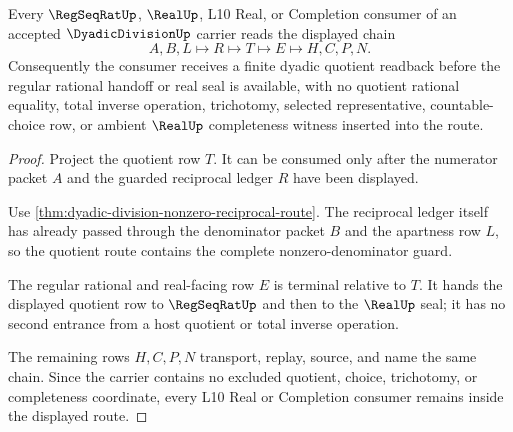 \begin{theorem}
\label{thm:dyadic-division-real-readback-nonescape}
Every $\RegSeqRatUp$, $\RealUp$, L10 Real, or Completion consumer of an accepted $\DyadicDivisionUp$ carrier reads the displayed chain
$$
A,B,L \longmapsto R \longmapsto T \longmapsto E \longmapsto H,C,P,N .
$$
Consequently the consumer receives a finite dyadic quotient readback before the regular rational handoff or real seal is available, with no quotient rational equality, total inverse operation, trichotomy, selected representative, countable-choice row, or ambient $\RealUp$ completeness witness inserted into the route.
\end{theorem}
\begin{proof}
Project the quotient row $T$. It can be consumed only after the numerator packet $A$ and the guarded reciprocal ledger $R$ have been displayed.

Use \autoref{thm:dyadic-division-nonzero-reciprocal-route}. The reciprocal ledger itself has already passed through the denominator packet $B$ and the apartness row $L$, so the quotient route contains the complete nonzero-denominator guard.

The regular rational and real-facing row $E$ is terminal relative to $T$. It hands the displayed quotient row to $\RegSeqRatUp$ and then to the $\RealUp$ seal; it has no second entrance from a host quotient or total inverse operation.

The remaining rows $H,C,P,N$ transport, replay, source, and name the same chain. Since the carrier contains no excluded quotient, choice, trichotomy, or completeness coordinate, every L10 Real or Completion consumer remains inside the displayed route.
\end{proof}



